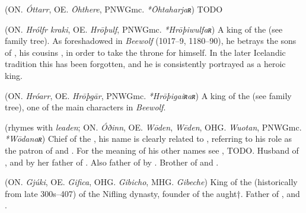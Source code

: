 \begin{itemize}
 (ON. \emph{Óttarr}, OE. \emph{Ōhthere}, PNWGmc. \emph{*Ōhtaharjaʀ})
  TODO

 (ON. \emph{Hrólfr kraki}, OE. \emph{Hrōþulf}, PNWGmc. \emph{*Hrōþiwulfaʀ})
  A king of the  (see family tree). As foreshadowed in \emph{Beewolf} (1017–9, 1180–90), he betrays the sons of , his cousins , in order to take the throne for himself. In the later Icelandic tradition this has been forgotten, and he is consistently portrayed as a heroic king.

 (ON. \emph{Hróarr}, OE. \emph{Hrōþgār}, PNWGmc. \emph{*Hrōþigaiʀaʀ})
  A king of the  (see family tree), one of the main characters in \emph{Beewolf}.

 (rhymes with \emph{leaden}; ON. \emph{Óðinn}, OE. \emph{Wōden}, \emph{Wēden}, OHG. \emph{Wuotan}, PNWGmc. \emph{*Wōdanaʀ})
  Chief of the , his name is clearly related to , referring to his role as the patron of  and . For the meaning of his other names see ,  TODO. Husband of , and by her father of . Also father of  by . Brother of  and .

 (ON. \emph{Gjúki}, OE. \emph{Gifica}, OHG. \emph{Gibicho}, MHG. \emph{Gibeche})
  King of the  (historically from late 300s–407) of the Nifling dynasty, founder of the  aught†. Father of ,  and .

\end{itemize}


